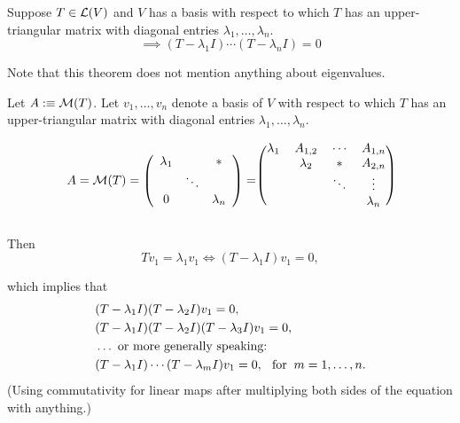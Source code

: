 \begin{thm}
  \label{thm: equation satisfied by operator with upper triangular matrix}
  Suppose $T\in \mathcal{L}(V)$ and $V$ has a basis with respect to which $T$ has an upper-triangular matrix with diagonal entries $\lambda_1, \dots, \lambda_n$.
  \begin{equation}
    \implies (T-\lambda_1I) \cdots (T-\lambda_nI)=0
  \end{equation}

  Note that this theorem does not mention anything about eigenvalues.
\end{thm}
\begin{prf}
  Let $A :\equiv \mathcal{M}(T)$. Let $v_1, \ldots, v_n$ denote a basis of $V$ with respect to which $T$  has an upper-triangular matrix with diagonal entries $\lambda_1, \ldots, \lambda_n$.

  \begin{minipage}{\linewidth}
  \begin{equation}
    A = \mmatrix(T)
    =
    \left( {\begin{array}{ccc}
        \lambda_1 &         &  * \\
                  &  \ddots &    \\
        0         &         & \lambda_n
    \end{array} } \right)
    =
    \begin{blockarray}{(cccc)}
       \lambda_1&  A_{1,2}  &  \cdots &  A_{1,n} \\
                & \lambda_2 &     *   &  A_{2,n} \\
                &           &  \ddots &  \vdots  \\
                &           &         & \lambda_n
    \end{blockarray}
  \end{equation}
  \end{minipage}

  Then
  \begin{equation}
    \label{i-need-a-ref}
    T v_1 = \lambda_1 v_1 \iff (T-\lambda_1 I)  v_1 = 0,
  \end{equation}

  which implies that
  \begin{equation}
\begin{aligned}
    &(T-\lambda_1 I)(T-\lambda_2 I)  v_1 =0, \\
    &(T-\lambda_1 I)(T-\lambda_2 I)(T-\lambda_3 I)  v_1 =0, \\
    &\ldots \text{ or more generally speaking:} \\
    &(T-\lambda_1 I) \cdots (T-\lambda_m I) v_1 = 0,
     \;\;\, \text{for}\;\; m = 1, \ldots, n.
\end{aligned}
  \end{equation}
  (Using commutativity for linear maps after multiplying both sides of the equation with anything.)
  \bigbreak


\end{prf}

